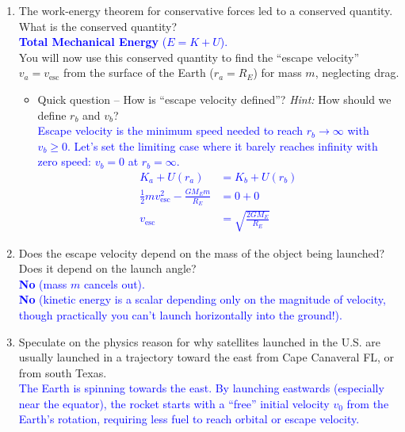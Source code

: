 \documentclass[11pt, letterpaper, openany]{book}
\newenvironment{exercise}[1][Exercise]{%
  \tcolorbox[blanker, breakable, left=1em,
    before skip=1em, after skip=1em,
    borderline west={3pt}{0pt}{PhysNavy},
    colback=PhysCream,
    before upper={\textcolor{PhysNavy}{\sffamily\bfseries #1:}\space}
  ]%
}{%
  \endtcolorbox%
}
\begin{document}
\begin{exercise}[Exercise 6]
\begin{enumerate}[label=(\alph*)]
    \item The work-energy theorem for conservative forces led to a conserved quantity. What is the conserved quantity? \\
    \textcolor{blue}{\textbf{Total Mechanical Energy} ($E = K + U$).} \\
    You will now use this conserved quantity to find the ``escape velocity'' $v_a = v_{\text{esc}}$ from the surface of the Earth ($r_a = R_E$) for mass $m$, neglecting drag.
    \begin{itemize}
        \item Quick question -- How is ``escape velocity defined''? \textit{Hint:} How should we define $r_b$ and $v_b$? \\
        \textcolor{blue}{
        Escape velocity is the minimum speed needed to reach $r_b \to \infty$ with $v_b \ge 0$. Let's set the limiting case where it barely reaches infinity with zero speed: $v_b = 0$ at $r_b = \infty$.
        \begin{align*}
            K_a + U(r_a) &= K_b + U(r_b) \\
            \frac{1}{2}m v_{\text{esc}}^2 - \frac{GM_E m}{R_E} &= 0 + 0 \\
            v_{\text{esc}} &= \sqrt{\frac{2GM_E}{R_E}}
        \end{align*}
        }
    \end{itemize}
    
    \item Does the escape velocity depend on the mass of the object being launched? \\
    Does it depend on the launch angle? \\
    \textcolor{blue}{\textbf{No} (mass $m$ cancels out). \\
    \textbf{No} (kinetic energy is a scalar depending only on the magnitude of velocity, though practically you can't launch horizontally into the ground!).}
    
    \item Speculate on the physics reason for why satellites launched in the U.S. are usually launched in a trajectory toward the east from Cape Canaveral FL, or from south Texas. \\
    \textcolor{blue}{The Earth is spinning towards the east. By launching eastwards (especially near the equator), the rocket starts with a ``free'' initial velocity $v_0$ from the Earth's rotation, requiring less fuel to reach orbital or escape velocity.}
\end{enumerate}
\end{exercise}
\end{document}
